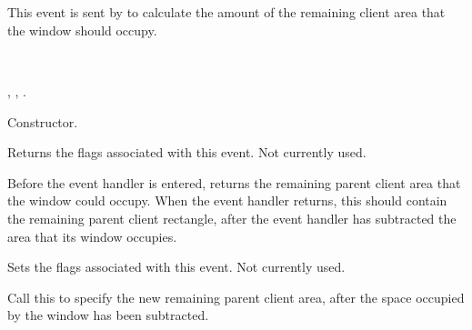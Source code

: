 \section{}\label{wxcalculatelayoutevent}

This event is sent by  to
calculate the amount of the remaining client area that the window should
occupy.


\\


\twocolwidtha{7cm}%
\begin{twocollist}\itemsep=0pt
\end{twocollist}


,\rtfsp
{},\rtfsp
{}.




Constructor.

\label{wxcalculatelayouteventgetflags}


Returns the flags associated with this event. Not currently used.

\label{wxcalculatelayouteventgetrect}


Before the event handler is entered, returns the remaining parent client area that the window
could occupy. When the event handler returns, this should contain the remaining parent client rectangle,
after the event handler has subtracted the area that its window occupies.

\label{wxcalculatelayouteventsetflags}


Sets the flags associated with this event. Not currently used.

\label{wxcalculatelayouteventsetrect}


Call this to specify the new remaining parent client area, after the space occupied by the
window has been subtracted.


